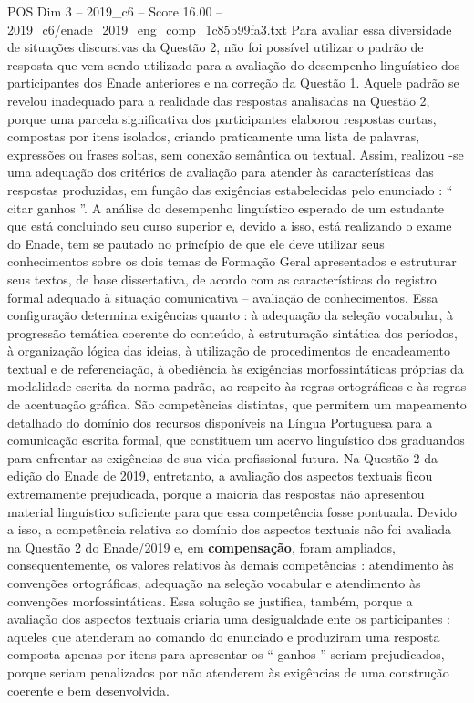 \begin{textsample}{POS Dim 3 – 2019\_c6 – Score 16.00 – 2019\_c6/enade\_2019\_eng\_comp\_1c85b99fa3.txt}
Para avaliar essa diversidade de situações discursivas da Questão 2, não foi possível utilizar o padrão de resposta que vem sendo utilizado para a avaliação do desempenho linguístico dos participantes dos Enade anteriores e na correção da Questão 1.
Aquele padrão se revelou inadequado para a realidade das respostas analisadas na Questão 2, porque uma parcela significativa dos participantes elaborou respostas curtas, compostas por itens isolados, criando praticamente uma lista de palavras, expressões ou frases soltas, sem conexão semântica ou textual.
Assim, realizou -se uma adequação dos critérios de avaliação para atender às características das respostas produzidas, em função das exigências estabelecidas pelo enunciado : “ citar ganhos ”.
A análise do desempenho linguístico esperado de um estudante que está concluindo seu curso superior e, devido a isso, está realizando o exame do Enade, tem se pautado no princípio de que ele deve utilizar seus conhecimentos sobre os dois temas de Formação Geral apresentados e estruturar seus textos, de base dissertativa, de acordo com as características do registro formal adequado à situação comunicativa – avaliação de conhecimentos.
Essa configuração determina exigências quanto : à adequação da seleção vocabular, à progressão temática coerente do conteúdo, à estruturação sintática dos períodos, à organização lógica das ideias, à utilização de procedimentos de encadeamento textual e de referenciação, à obediência às exigências morfossintáticas próprias da modalidade escrita da norma-padrão, ao respeito às regras ortográficas e às regras de acentuação gráfica.
São competências distintas, que permitem um mapeamento detalhado do domínio dos recursos disponíveis na Língua Portuguesa para a comunicação escrita formal, que constituem um acervo linguístico dos graduandos para enfrentar as exigências de sua vida profissional futura.
Na Questão 2 da edição do Enade de 2019, entretanto, a avaliação dos aspectos textuais ficou extremamente prejudicada, porque a maioria das respostas não apresentou material linguístico suficiente para que essa competência fosse pontuada.
Devido a isso, a competência relativa ao domínio dos aspectos textuais não foi avaliada na Questão 2 do Enade/2019 e, em \textbf{compensação}, foram ampliados, consequentemente, os valores relativos às demais competências : atendimento às convenções ortográficas, adequação na seleção vocabular e atendimento às convenções morfossintáticas.
Essa solução se justifica, também, porque a avaliação dos aspectos textuais criaria uma desigualdade ente os participantes : aqueles que atenderam ao comando do enunciado e produziram uma resposta composta apenas por itens para apresentar os “ ganhos ” seriam prejudicados, porque seriam penalizados por não atenderem às exigências de uma construção coerente e bem desenvolvida.

\end{textsample}
